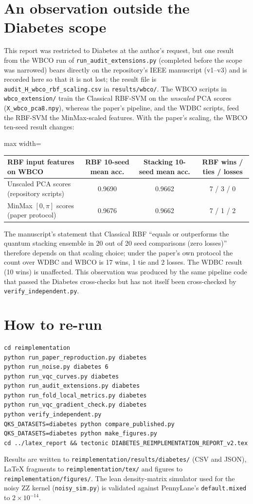 \documentclass[11pt,a4paper]{article}
\newcommand{\code}[1]{\texttt{\small #1}}
\begin{document}
\section{An observation outside the Diabetes scope}
\label{app:wbco}
This report was restricted to Diabetes at the author's request, but one result from the WBCO run of \code{run\_audit\_extensions.py} (completed before the scope was narrowed) bears directly on the repository's IEEE manuscript (v1--v3) and is recorded here so that it is not lost; the result file is \code{audit\_H\_wbco\_rbf\_scaling.csv} in \code{results/wbco/}. The WBCO scripts in \code{wbco\_extension/} train the Classical RBF-SVM on the \emph{unscaled} PCA scores (\code{X\_wbco\_pca8.npy}), whereas the paper's pipeline, and the WDBC scripts, feed the RBF-SVM the MinMax-scaled features. With the paper's scaling, the WBCO ten-seed result changes:
\begin{center}\footnotesize
\begin{adjustbox}{max width=\textwidth}
\begin{tabular}{lccc}
\toprule
RBF input features on WBCO & RBF 10-seed mean acc. & Stacking 10-seed mean acc. & RBF wins / ties / losses \\
\midrule
Unscaled PCA scores (repository scripts) & 0.9690 & 0.9662 & 7 / 3 / 0 \\
MinMax $[0,\pi]$ scores (paper protocol) & 0.9676 & 0.9662 & 7 / 1 / 2 \\
\bottomrule
\end{tabular}
\end{adjustbox}
\end{center}
The manuscript's statement that Classical RBF ``equals or outperforms the quantum stacking ensemble in 20 out of 20 seed comparisons (zero losses)'' therefore depends on that scaling choice; under the paper's own protocol the count over WDBC and WBCO is 17 wins, 1 tie and 2 losses. The WDBC result (10 wins) is unaffected. This observation was produced by the same pipeline code that passed the Diabetes cross-checks but has not itself been cross-checked by \code{verify\_independent.py}.

\section{How to re-run}
\begin{verbatim}
cd reimplementation
python run_paper_reproduction.py diabetes
python run_noise.py diabetes 6
python run_vqc_curves.py diabetes
python run_audit_extensions.py diabetes
python run_fold_local_metrics.py diabetes
python run_vqc_gradient_check.py diabetes
python verify_independent.py
QKS_DATASETS=diabetes python compare_published.py
QKS_DATASETS=diabetes python make_figures.py
cd ../latex_report && tectonic DIABETES_REIMPLEMENTATION_REPORT_v2.tex
\end{verbatim}
Results are written to \code{reimplementation/results/diabetes/} (CSV and JSON), LaTeX fragments to \code{reimplementation/tex/} and figures to \code{reimplementation/figures/}. The lean density-matrix simulator used for the noisy ZZ kernel (\code{noisy\_sim.py}) is validated against PennyLane's \code{default.mixed} to $2\times10^{-14}$.
\end{document}
